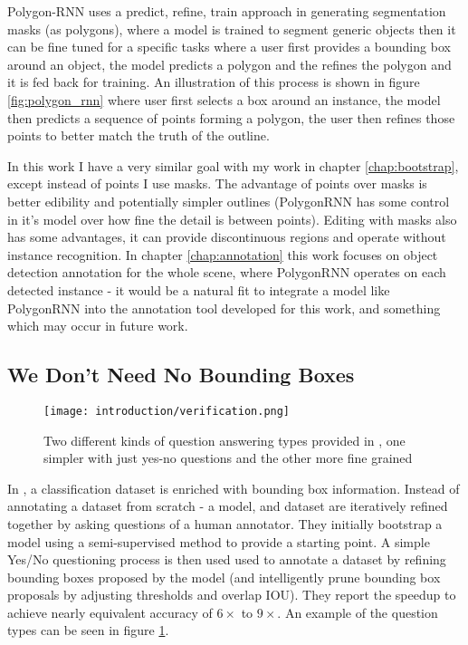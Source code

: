 Polygon-RNN \cite{Castrejon2017} uses a predict, refine, train approach in generating segmentation masks (as polygons), where a model is trained to segment generic objects then it can be fine tuned for a specific tasks where a user first provides a bounding box around an object, the model predicts a polygon and the refines the polygon and it is fed back for training. An illustration of this process is shown in figure \ref{fig:polygon_rnn} where user first selects a box around an instance, the model then predicts a sequence of points forming a polygon, the user then refines those points to better match the truth of the outline.

In this work I have a very similar goal with my work in chapter \ref{chap:bootstrap}, except instead of points I use masks. The advantage of points over masks is better edibility and potentially simpler outlines (PolygonRNN has some control in it's model over how fine the detail is between points). Editing with masks also has some advantages, it can provide discontinuous regions and operate without instance recognition. In chapter \ref{chap:annotation} this work focuses on object detection annotation for the whole scene, where PolygonRNN operates on each detected instance - it would be a natural fit to integrate a model like PolygonRNN into the annotation tool developed for this work, and something which may occur in future work.


\subsection {We Don't Need No Bounding Boxes}

\begin{figure}[h]
  \centering
  \texttt{[image: introduction/verification.png]}
  \caption{Two different kinds of question answering types provided in \cite{Papadopoulos2016}, one simpler with just yes-no questions and the other more fine grained}
  \label{fig:verification}
\end{figure}

In \cite{Papadopoulos2016}, a classification dataset is enriched with bounding box information. Instead of annotating a dataset from scratch - a model, and dataset are iteratively refined together by asking questions of a human annotator. They initially bootstrap a model using a semi-supervised method  \cite{Cinbis2017} to provide a starting point. A simple Yes/No questioning process is then used used to annotate a dataset by refining bounding boxes proposed by the model (and intelligently prune bounding box proposals by adjusting thresholds and overlap \gls{IOU}). They report the speedup to achieve nearly equivalent accuracy of $6\times$ to $9\times$. An example of the question types can be seen in figure \ref{fig:verification}. 

